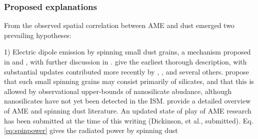   \subsubsection{Proposed explanations}

     From the observed spatial correlation between AME and dust emerged two prevailing hypotheses:

    1) Electric dipole emission by spinning small dust grains, a mechanism proposed in \cite{erickson57} and \cite{hoyle70}, with further discussion in \cite{ferrara94}. \cite{draine98b} give the earliest thorough description, with substantial updates contributed more recently by \cite{ysard10a}, \cite{ali-haimoud09}, \cite{hoang10} and several others. \cite{hensley17a} propose that such small spinning grains may consist primarily of silicates, and that this is allowed by observational upper-bounds of nanosilicate abudance, although nanosilicates have not yet been detected in the ISM. \cite{dickinson13r} provide a detailed overview of AME and spinning dust literature. An updated state of play of AME research has been submitted at the time of this writing (Dickinson, et al., submitted). Eq. \ref{eq:spinpower} gives the radiated power by spinning dust


